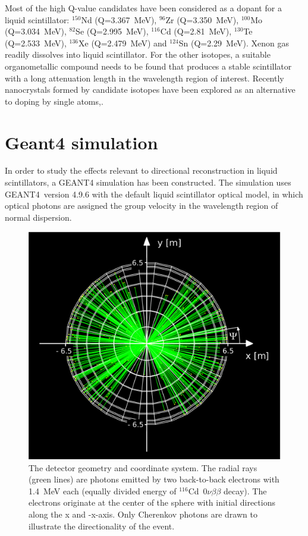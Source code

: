 \documentclass[cits]{JINST}
\newcommand{\GEANT}{GEANT4}
\begin{document}
Most of the high Q-value candidates
have been considered as a dopant for a liquid scintillator:
$^{150}$Nd (Q=3.367~MeV)\cite{minfang,nd1}, $^{96}$Zr (Q=3.350~MeV)\cite{zr1},
$^{100}$Mo (Q=3.034~MeV)\cite{mo1}, $^{82}$Se (Q=2.995~MeV)\cite{qdot},
$^{116}$Cd (Q=2.81~MeV)\cite{qdot, cd1}, $^{130}$Te (Q=2.533~MeV)\cite{qdot, biller},
$^{136}$Xe (Q=2.479~MeV)\cite{KZ0nu} and $^{124}$Sn (Q=2.29~MeV)\cite{sn1}.
Xenon gas readily dissolves into liquid scintillator. For the other isotopes,
a suitable organometallic compound needs to be found that produces a stable
scintillator with a long attenuation length in the wavelength region of
interest. Recently nanocrystals formed by candidate isotopes have been explored as an alternative to doping by single atoms,\cite{qdot,qdot2}.

\section{Geant4 simulation}
\label{sim_section}
In order to study the effects relevant to directional reconstruction
in liquid scintillators, a \GEANT \newline 
\cite{geant4one,geant4two} simulation
has been constructed. The simulation uses \GEANT~version 4.9.6 with the default liquid scintillator
optical model, in which optical photons are
assigned the group velocity in the wavelength region of normal
dispersion.

\begin{figure}
        \begin{center}
        \includegraphics[scale=0.4]{graphs/geometry_plot_labels.pdf}
        \caption[]{The detector geometry and coordinate system.
        The radial rays (green lines) are photons emitted by two back-to-back electrons with 1.4~MeV each
        (equally divided energy of $^{116}$Cd~$0\nu\beta\beta$ decay). The electrons originate at
        the center of the sphere with initial directions along the x
        and -x-axis. Only Cherenkov photons are drawn to illustrate the
        directionality of the event. \label{detector_view}}
        \end{center}
\end{figure}
\end{document}
